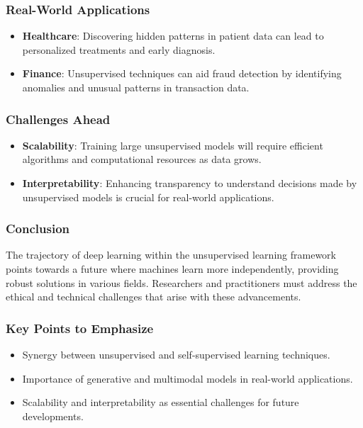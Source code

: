 \documentclass[aspectratio=169]{beamer}
\begin{document}
\begin{frame}[fragile]
    \frametitle{Real-World Applications}
    \begin{itemize}
        \item \textbf{Healthcare}: Discovering hidden patterns in patient data can lead to personalized treatments and early diagnosis.
        \item \textbf{Finance}: Unsupervised techniques can aid fraud detection by identifying anomalies and unusual patterns in transaction data.
    \end{itemize}
\end{frame}

\begin{frame}[fragile]
    \frametitle{Challenges Ahead}
    \begin{itemize}
        \item \textbf{Scalability}: Training large unsupervised models will require efficient algorithms and computational resources as data grows.
        \item \textbf{Interpretability}: Enhancing transparency to understand decisions made by unsupervised models is crucial for real-world applications.
    \end{itemize}
\end{frame}

\begin{frame}[fragile]
    \frametitle{Conclusion}
    The trajectory of deep learning within the unsupervised learning framework points towards a future where machines learn more independently, providing robust solutions in various fields. Researchers and practitioners must address the ethical and technical challenges that arise with these advancements.
\end{frame}

\begin{frame}[fragile]
    \frametitle{Key Points to Emphasize}
    \begin{itemize}
        \item Synergy between unsupervised and self-supervised learning techniques.
        \item Importance of generative and multimodal models in real-world applications.
        \item Scalability and interpretability as essential challenges for future developments.
    \end{itemize}
\end{frame}
\end{document}

